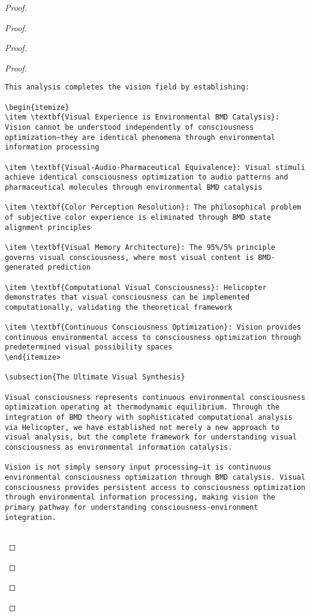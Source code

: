 \documentclass[12pt,a4paper]{article}
\begin{document}
\begin{proof}
{\begin{proof}
\begin{proof}
\begin{proof}
\begin{lstlisting}[style=pythonstyle, caption=Visual Memory BMD Integration]
This analysis completes the vision field by establishing:

\begin{itemize}
\item \textbf{Visual Experience is Environmental BMD Catalysis}: Vision cannot be understood independently of consciousness optimization—they are identical phenomena through environmental information processing

\item \textbf{Visual-Audio-Pharmaceutical Equivalence}: Visual stimuli achieve identical consciousness optimization to audio patterns and pharmaceutical molecules through environmental BMD catalysis

\item \textbf{Color Perception Resolution}: The philosophical problem of subjective color experience is eliminated through BMD state alignment principles

\item \textbf{Visual Memory Architecture}: The 95%/5% principle governs visual consciousness, where most visual content is BMD-generated prediction

\item \textbf{Computational Visual Consciousness}: Helicopter demonstrates that visual consciousness can be implemented computationally, validating the theoretical framework

\item \textbf{Continuous Consciousness Optimization}: Vision provides continuous environmental access to consciousness optimization through predetermined visual possibility spaces
\end{itemize>

\subsection{The Ultimate Visual Synthesis}

Visual consciousness represents continuous environmental consciousness optimization operating at thermodynamic equilibrium. Through the integration of BMD theory with sophisticated computational analysis via Helicopter, we have established not merely a new approach to visual analysis, but the complete framework for understanding visual consciousness as environmental information catalysis.

Vision is not simply sensory input processing—it is continuous environmental consciousness optimization through BMD catalysis. Visual consciousness provides persistent access to consciousness optimization through environmental information processing, making vision the primary pathway for understanding consciousness-environment integration.


\end{lstlisting}
\end{proof}
\end{proof}
\end{proof}}
\end{proof}
\end{document}
